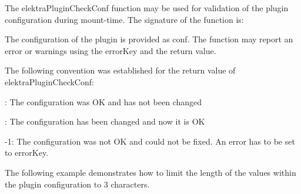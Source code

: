 The {\ttfamily elektra\+Plugin\+Check\+Conf} function may be used for validation of the plugin configuration during mount-\/time. The signature of the function is\+:


\begin{DoxyCode}{0}
\end{DoxyCode}


The configuration of the plugin is provided as {\ttfamily conf}. The function may report an error or warnings using the {\ttfamily error\+Key} and the return value.

The following convention was established for the return value of {\ttfamily elektra\+Plugin\+Check\+Conf}\+:


\begin{DoxyItemize}
\item {}\+: The configuration was OK and has not been changed
\item {}\+: The configuration has been changed and now it is OK
\item {\ttfamily -\/1}\+: The configuration was not OK and could not be fixed. An error has to be set to error\+Key.
\end{DoxyItemize}

The following example demonstrates how to limit the length of the values within the plugin configuration to 3 characters.


\begin{DoxyCode}{0}
\DoxyCodeLine{\{}
\DoxyCodeLine{        \{}
\DoxyCodeLine{                \{}
\DoxyCodeLine{                                            \textcolor{stringliteral}{"Value '\%s' is more than 3 characters long"},}
\DoxyCodeLine{                \}}
\DoxyCodeLine{        \}}
\DoxyCodeLine{\}}
\end{DoxyCode}


